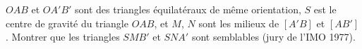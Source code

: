 $OAB$ et $OA'B'$ sont des triangles équilatéraux de même orientation, $S$ est le centre de gravité du triangle $OAB$, et $M$, $N$ sont les milieux de $[A'B]$ et $[AB']$. Montrer que les triangles $SMB'$ et $SNA'$ sont semblables (jury de l'IMO 1977).

